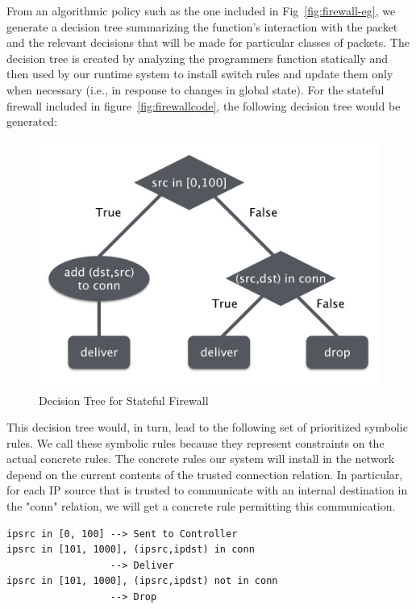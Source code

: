 \documentclass[preprint]{sigplanconf}
\begin{document}
From an algorithmic policy such as the one included in Fig~\ref{fig:firewall-eg}, we generate a decision tree summarizing the function's interaction with the packet and the relevant decisions that will be made for particular classes of packets. The decision tree is created by analyzing the programmers function statically and then used by our runtime system to install switch rules and update them only when necessary (i.e., in response to changes in global state). For the stateful firewall included in figure~\ref{fig:firewallcode}, the following decision tree would be generated:


\begin{figure}[ht]
\includegraphics[scale=.5]{img/dtree.png}
\caption{Decision Tree for Stateful Firewall}     
\label{fig:decisiontree}  
  \end{figure}

This decision tree would, in turn, lead to the following set of prioritized symbolic rules. We call these symbolic rules because they represent constraints on the actual concrete rules. The concrete rules our system will install in the network depend on the current contents of the trusted connection relation. In particular, for each IP source that is trusted to communicate with an internal destination in the "conn" relation, we will get a concrete rule permitting this communication.
  \begin{lstlisting}
ipsrc in [0, 100] --> Sent to Controller
ipsrc in [101, 1000], (ipsrc,ipdst) in conn
                  --> Deliver
ipsrc in [101, 1000], (ipsrc,ipdst) not in conn
                  --> Drop
  \end{lstlisting}
\end{document}
